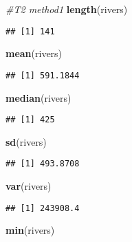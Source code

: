\documentclass[
]{article}
\newenvironment{Shaded}{\begin{snugshade}}{\end{snugshade}}
\newcommand{\CommentTok}[1]{\textcolor[rgb]{0.56,0.35,0.01}{\textit{#1}}}
\newcommand{\FunctionTok}[1]{\textcolor[rgb]{0.13,0.29,0.53}{\textbf{#1}}}
\newcommand{\NormalTok}[1]{#1}
\begin{document}
\begin{Shaded}
\begin{Highlighting}[]
\CommentTok{\#T2 method1}
\FunctionTok{length}\NormalTok{(rivers)}
\end{Highlighting}
\end{Shaded}

\begin{verbatim}
## [1] 141
\end{verbatim}

\begin{Shaded}
\begin{Highlighting}[]
\FunctionTok{mean}\NormalTok{(rivers)}
\end{Highlighting}
\end{Shaded}

\begin{verbatim}
## [1] 591.1844
\end{verbatim}

\begin{Shaded}
\begin{Highlighting}[]
\FunctionTok{median}\NormalTok{(rivers)}
\end{Highlighting}
\end{Shaded}

\begin{verbatim}
## [1] 425
\end{verbatim}

\begin{Shaded}
\begin{Highlighting}[]
\FunctionTok{sd}\NormalTok{(rivers)}
\end{Highlighting}
\end{Shaded}

\begin{verbatim}
## [1] 493.8708
\end{verbatim}

\begin{Shaded}
\begin{Highlighting}[]
\FunctionTok{var}\NormalTok{(rivers)}
\end{Highlighting}
\end{Shaded}

\begin{verbatim}
## [1] 243908.4
\end{verbatim}

\begin{Shaded}
\begin{Highlighting}[]
\FunctionTok{min}\NormalTok{(rivers)}
\end{Highlighting}
\end{Shaded}
\end{document}
